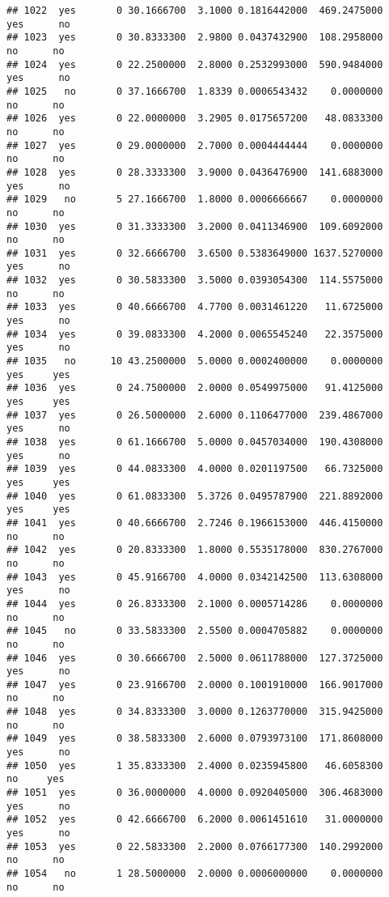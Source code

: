 \documentclass[]{article}
\begin{document}
\begin{verbatim}
## 1022  yes       0 30.1666700  3.1000 0.1816442000  469.2475000   yes      no
## 1023  yes       0 30.8333300  2.9800 0.0437432900  108.2958000    no      no
## 1024  yes       0 22.2500000  2.8000 0.2532993000  590.9484000   yes      no
## 1025   no       0 37.1666700  1.8339 0.0006543432    0.0000000    no      no
## 1026  yes       0 22.0000000  3.2905 0.0175657200   48.0833300    no      no
## 1027  yes       0 29.0000000  2.7000 0.0004444444    0.0000000    no      no
## 1028  yes       0 28.3333300  3.9000 0.0436476900  141.6883000   yes      no
## 1029   no       5 27.1666700  1.8000 0.0006666667    0.0000000    no      no
## 1030  yes       0 31.3333300  3.2000 0.0411346900  109.6092000    no      no
## 1031  yes       0 32.6666700  3.6500 0.5383649000 1637.5270000   yes      no
## 1032  yes       0 30.5833300  3.5000 0.0393054300  114.5575000    no      no
## 1033  yes       0 40.6666700  4.7700 0.0031461220   11.6725000   yes      no
## 1034  yes       0 39.0833300  4.2000 0.0065545240   22.3575000   yes      no
## 1035   no      10 43.2500000  5.0000 0.0002400000    0.0000000   yes     yes
## 1036  yes       0 24.7500000  2.0000 0.0549975000   91.4125000   yes     yes
## 1037  yes       0 26.5000000  2.6000 0.1106477000  239.4867000   yes      no
## 1038  yes       0 61.1666700  5.0000 0.0457034000  190.4308000   yes      no
## 1039  yes       0 44.0833300  4.0000 0.0201197500   66.7325000   yes     yes
## 1040  yes       0 61.0833300  5.3726 0.0495787900  221.8892000   yes     yes
## 1041  yes       0 40.6666700  2.7246 0.1966153000  446.4150000    no      no
## 1042  yes       0 20.8333300  1.8000 0.5535178000  830.2767000    no      no
## 1043  yes       0 45.9166700  4.0000 0.0342142500  113.6308000   yes      no
## 1044  yes       0 26.8333300  2.1000 0.0005714286    0.0000000    no      no
## 1045   no       0 33.5833300  2.5500 0.0004705882    0.0000000    no      no
## 1046  yes       0 30.6666700  2.5000 0.0611788000  127.3725000   yes      no
## 1047  yes       0 23.9166700  2.0000 0.1001910000  166.9017000    no      no
## 1048  yes       0 34.8333300  3.0000 0.1263770000  315.9425000    no      no
## 1049  yes       0 38.5833300  2.6000 0.0793973100  171.8608000   yes      no
## 1050  yes       1 35.8333300  2.4000 0.0235945800   46.6058300    no     yes
## 1051  yes       0 36.0000000  4.0000 0.0920405000  306.4683000   yes      no
## 1052  yes       0 42.6666700  6.2000 0.0061451610   31.0000000   yes      no
## 1053  yes       0 22.5833300  2.2000 0.0766177300  140.2992000    no      no
## 1054   no       1 28.5000000  2.0000 0.0006000000    0.0000000    no      no

\end{verbatim}
\end{document}
